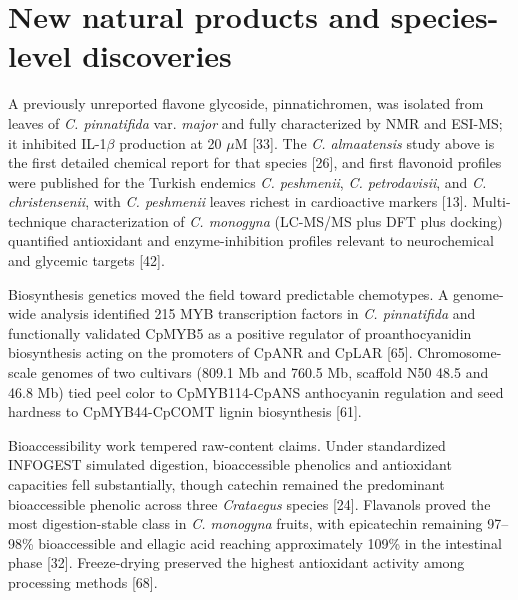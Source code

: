 \documentclass[11pt]{article}
\begin{document}
\begin{center}
\end{center}

\section*{New natural products and species-level discoveries}
A previously unreported flavone glycoside, pinnatichromen, was isolated from leaves of \emph{C. pinnatifida} var. \emph{major} and fully characterized by NMR and ESI-MS; it inhibited IL-1$\beta$ production at 20 $\mu$M [33]. The \emph{C. almaatensis} study above is the first detailed chemical report for that species [26], and first flavonoid profiles were published for the Turkish endemics \emph{C. peshmenii}, \emph{C. petrodavisii}, and \emph{C. christensenii}, with \emph{C. peshmenii} leaves richest in cardioactive markers [13]. Multi-technique characterization of \emph{C. monogyna} (LC-MS/MS plus DFT plus docking) quantified antioxidant and enzyme-inhibition profiles relevant to neurochemical and glycemic targets [42].

Biosynthesis genetics moved the field toward predictable chemotypes. A genome-wide analysis identified 215 MYB transcription factors in \emph{C. pinnatifida} and functionally validated CpMYB5 as a positive regulator of proanthocyanidin biosynthesis acting on the promoters of CpANR and CpLAR [65]. Chromosome-scale genomes of two cultivars (809.1 Mb and 760.5 Mb, scaffold N50 48.5 and 46.8 Mb) tied peel color to CpMYB114-CpANS anthocyanin regulation and seed hardness to CpMYB44-CpCOMT lignin biosynthesis [61].

Bioaccessibility work tempered raw-content claims. Under standardized INFOGEST simulated digestion, bioaccessible phenolics and antioxidant capacities fell substantially, though catechin remained the predominant bioaccessible phenolic across three \emph{Crataegus} species [24]. Flavanols proved the most digestion-stable class in \emph{C. monogyna} fruits, with epicatechin remaining 97--98\% bioaccessible and ellagic acid reaching approximately 109\% in the intestinal phase [32]. Freeze-drying preserved the highest antioxidant activity among processing methods [68].
\end{document}
